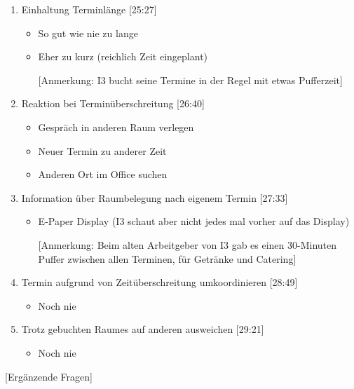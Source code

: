 \begin{enumerate}

    \item Einhaltung Terminlänge [25:27]
     \begin{itemize}
        \item So gut wie nie zu lange
        \item Eher zu kurz (reichlich Zeit eingeplant)
        \item[] [Anmerkung: I3 bucht seine Termine in der Regel mit etwas Pufferzeit]
    \end{itemize}
    
    \item Reaktion bei Terminüberschreitung [26:40]
     \begin{itemize}
        \item Gespräch in anderen Raum verlegen
        \item Neuer Termin zu anderer Zeit
        \item Anderen Ort im Office suchen
    \end{itemize}
    
    \item Information über Raumbelegung nach eigenem Termin [27:33]
     \begin{itemize}
        \item E-Paper Display (I3 schaut aber nicht jedes mal vorher auf das Display)
        \item[] [Anmerkung: Beim alten Arbeitgeber von I3 gab es einen 30-Minuten Puffer zwischen allen Terminen, für Getränke und Catering]
    \end{itemize}
    
    \item Termin aufgrund von Zeitüberschreitung umkoordinieren [28:49]
     \begin{itemize}
        \item Noch nie
    \end{itemize}

    \item Trotz gebuchten Raumes auf anderen ausweichen [29:21]
     \begin{itemize}
        \item Noch nie
    \end{itemize}

\end{enumerate}

[Ergänzende Fragen]

